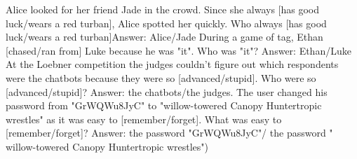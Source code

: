 \begin{foo}
Alice looked for her friend Jade in the crowd. Since she always [has good luck/wears a red turban], Alice spotted her quickly. Who always [has good luck/wears a red turban]Answer: Alice/Jade
During a game of tag, Ethan [chased/ran from] Luke because he was "it". Who was "it"? Answer: Ethan/Luke
At the Loebner competition the judges couldn't figure out which respondents were the chatbots because they were so [advanced/stupid]. Who were so [advanced/stupid]? Answer: the chatbots/the judges.
The user changed his password from "GrWQWu8JyC" to "willow-towered Canopy Huntertropic wrestles" as it was easy to [remember/forget]. What was easy to [remember/forget]? Answer: the password  "GrWQWu8JyC"/ the password  " willow-towered Canopy Huntertropic wrestles") \end{foo}


